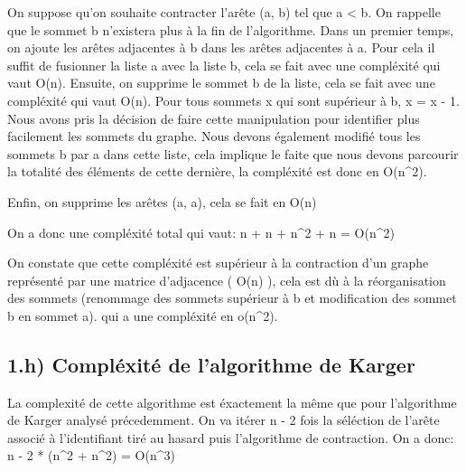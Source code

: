 On suppose qu'on souhaite contracter l'arête (a, b) tel que a < b. On rappelle que le sommet b n'existera plus à la fin de l'algorithme.\newline
Dans un premier temps, on ajoute les arêtes adjacentes à b dans les arêtes adjacentes à a. Pour cela il suffit de fusionner la liste a avec la liste b, cela se fait avec une compléxité qui vaut O(n). \newline
Ensuite, on supprime le sommet b de la liste, cela se fait avec une compléxité qui vaut O(n). Pour tous sommets x qui sont supérieur à b, x = x - 1. Nous avons pris la décision de faire cette manipulation pour identifier plus facilement les sommets du graphe. Nous devons également modifié tous les sommets b par a dans cette liste, cela implique le faite que nous devons parcourir la totalité des éléments de cette dernière, la compléxité est donc en O(n^2). \newline


Enfin, on supprime les arêtes (a, a), cela se fait en O(n) \newline \newline


On a donc une compléxité total qui vaut: n + n + n^2 + n = O(n^2)

\newline

On constate que cette compléxité est supérieur à la contraction d'un graphe représenté par une matrice d'adjacence ( O(n) ), cela est dù à la réorganisation des sommets (renommage des sommets supérieur à b et modification des sommet b en sommet a). qui a une compléxité en o(n^2).



\newline \newline 


\subsection{1.h) Compléxité de l'algorithme de Karger}

La complexité de cette algorithme est éxactement la même que pour l'algorithme de Karger analysé précedemment. \newline
On va itérer n - 2 fois la séléction de l'arête associé à l'identifiant tiré au hasard puis l'algorithme de contraction. \newline \newline
On a donc: n - 2 * (n^2 + n^2) = O(n^3)



